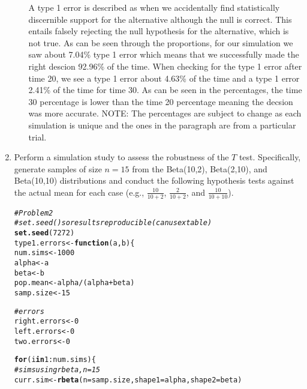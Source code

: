 \documentclass{article}\usepackage[]{graphicx}\usepackage[]{xcolor}
\makeatletter
\newcommand{\hlnum}[1]{\textcolor[rgb]{0.686,0.059,0.569}{#1}}%
\newcommand{\hlcom}[1]{\textcolor[rgb]{0.678,0.584,0.686}{\textit{#1}}}%
\newcommand{\hlopt}[1]{\textcolor[rgb]{0,0,0}{#1}}%
\newcommand{\hldef}[1]{\textcolor[rgb]{0.345,0.345,0.345}{#1}}%
\newcommand{\hlkwa}[1]{\textcolor[rgb]{0.161,0.373,0.58}{\textbf{#1}}}%
\newcommand{\hlkwb}[1]{\textcolor[rgb]{0.69,0.353,0.396}{#1}}%
\newcommand{\hlkwc}[1]{\textcolor[rgb]{0.333,0.667,0.333}{#1}}%
\newcommand{\hlkwd}[1]{\textcolor[rgb]{0.737,0.353,0.396}{\textbf{#1}}}%
\newenvironment{kframe}{%
 \def\at@end@of@kframe{}%
 \ifinner\ifhmode%
  \def\at@end@of@kframe{\end{minipage}}%
  \begin{minipage}{\columnwidth}%
 \fi\fi%
 \def\FrameCommand##1{\hskip\@totalleftmargin \hskip-\fboxsep
 \colorbox{shadecolor}{##1}\hskip-\fboxsep
     \hskip-\linewidth \hskip-\@totalleftmargin \hskip\columnwidth}%
 \MakeFramed {\advance\hsize-\width
   \@totalleftmargin\z@ \linewidth\hsize
   \@setminipage}}%
 {\par\unskip\endMakeFramed%
 \at@end@of@kframe}
\newenvironment{knitrout}{}{} %
\makeatother
\begin{document}
\begin{enumerate}
\begin{enumerate}
A type 1 error is described as when we accidentally find statistically discernible support for the alternative although the null is correct. This entails falsely rejecting the null hypothesis for the alternative, which is not true. As can be seen through the proportions, for our simulation we saw about 7.04\% type 1 error which means that we successfully made the right descion 92.96\% of the time. When checking for the type 1 error after time 20, we see a type 1 error about 4.63\% of the time and a type 1 error 2.41\% of the time for time 30. As can be seen in the percentages, the time 30 percentage is lower than the time 20 percentage meaning the decsion was more accurate. NOTE: The percentages are subject to change as each simulation is unique and the ones in the paragraph are from a particular trial.
\end{enumerate}
  \item Perform a simulation study to assess the robustness of the $T$ test. 
  Specifically, generate samples of size $n=15$ from the Beta(10,2), Beta(2,10), 
  and Beta(10,10) distributions and conduct the following hypothesis tests against 
  the actual mean for each case (e.g., $\frac{10}{10+2}$, $\frac{2}{10+2}$, and 
  $\frac{10}{10+10}$). 
  
\begin{knitrout}
\color{fgcolor}\begin{kframe}
\begin{alltt}
\hlcom{# Problem 2}
\hlcom{# set.seed() so results reproducible (can use xtable)}
\hlkwd{set.seed}\hldef{(}\hlnum{7272}\hldef{)}
\hldef{type1.errors} \hlkwb{<-} \hlkwa{function}\hldef{(}\hlkwc{a}\hldef{,} \hlkwc{b}\hldef{)\{}
  \hldef{num.sims} \hlkwb{<-} \hlnum{1000}
  \hldef{alpha} \hlkwb{<-} \hldef{a}
  \hldef{beta} \hlkwb{<-} \hldef{b}
  \hldef{pop.mean} \hlkwb{<-} \hldef{alpha}\hlopt{/}\hldef{(alpha} \hlopt{+} \hldef{beta)}
  \hldef{samp.size} \hlkwb{<-} \hlnum{15}

  \hlcom{# errors}
  \hldef{right.errors} \hlkwb{<-} \hlnum{0}
  \hldef{left.errors} \hlkwb{<-} \hlnum{0}
  \hldef{two.errors} \hlkwb{<-} \hlnum{0}

  \hlkwa{for}\hldef{(i} \hlkwa{in} \hlnum{1}\hlopt{:}\hldef{num.sims)\{}
\hlcom{# sims using rbeta, n = 15}
\hldef{curr.sim} \hlkwb{<-} \hlkwd{rbeta}\hldef{(}\hlkwc{n}\hldef{=samp.size,} \hlkwc{shape1} \hldef{= alpha,} \hlkwc{shape2} \hldef{= beta)}


\end{alltt}
\end{kframe}
\end{knitrout}
\end{enumerate}
\end{document}
